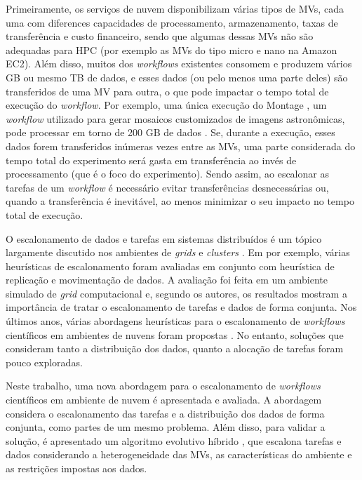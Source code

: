 Primeiramente, os serviços de nuvem disponibilizam várias tipos de MVs, cada uma com diferences capacidades de processamento, armazenamento, taxas de transferência e custo financeiro, sendo que algumas dessas MVs não são adequadas para HPC (por exemplo as MVs do tipo micro e nano na Amazon EC2). Além disso, muitos dos \textit{workflows} existentes consomem e produzem vários GB ou mesmo TB de dados, e esses dados (ou pelo menos uma parte deles) são transferidos de uma MV para outra, o que pode impactar o tempo total de execução do \textit{workflow}. Por exemplo, uma única execução do Montage \cite{Deelman2008}, um \textit{workflow} utilizado para gerar mosaicos customizados de imagens astronômicas, pode processar em torno de 200 GB de dados \cite{Juve2013}. Se, durante a execução, esses dados forem transferidos inúmeras vezes entre as MVs, uma parte considerada do tempo total do experimento será gasta em transferência ao invés de processamento (que é o foco do experimento). Sendo assim, ao escalonar as tarefas de um \textit{workflow} é necessário evitar transferências desnecessárias ou, quando a transferência é inevitável, ao menos minimizar o seu impacto no tempo total de execução.

O escalonamento de dados e tarefas em sistemas distribuídos é um tópico largamente discutido nos ambientes de \textit{grids} e \textit{clusters} \cite{Dong2006, HEFT, Isard2009, Ranganathan2002s}. Em \cite{Ranganathan2002s} por exemplo, várias heurísticas de escalonamento foram avaliadas em conjunto com heurística de replicação e movimentação de dados. A avaliação foi feita em um ambiente simulado de \textit{grid} computacional e, segundo os autores, os resultados mostram a importância de tratar o escalonamento de tarefas e dados de forma conjunta. Nos últimos anos, várias abordagens heurísticas para o escalonamento de \textit{workflows} científicos em ambientes de nuvens foram propostas \cite{Liu2014, pandey2010, Yuan2010, Szabo2013, Bryk, Oliveira2012, OliveiraPorto2015}. No entanto, soluções que consideram tanto a distribuição dos dados, quanto a alocação de tarefas foram pouco exploradas.

Neste trabalho, uma nova abordagem para o escalonamento de \textit{workflows} científicos em ambiente de nuvem é apresentada e avaliada. A abordagem considera o escalonamento das tarefas e a distribuição dos dados de forma conjunta, como partes de um mesmo problema. Além disso, para validar a solução, é apresentado um algoritmo evolutivo híbrido \cite{Moscato2010}, que escalona tarefas e dados considerando a heterogeneidade das MVs, as características do ambiente e as restrições impostas aos dados. 

